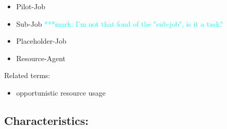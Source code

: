 \documentclass[]{article}
\newcommand{\msnote}[1]{ {\textcolor{cyan} { ***mark: #1 }}}
\begin{document}
\begin{itemize}
	\item Pilot-Job
	\item Sub-Job
	\msnote{I'm not that fond of the "sub-job", is it a task?}
	\item Placeholder-Job
	\item Resource-Agent
\end{itemize}


Related terms:
\begin{itemize}
	\item opportunistic resource usage
\end{itemize}

\subsection{Characteristics:}
\end{document}
